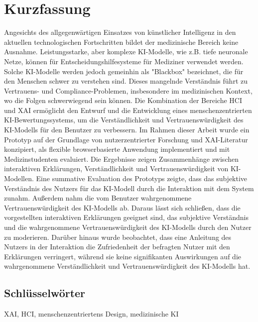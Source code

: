 \chapter*{Kurzfassung}
Angesichts des allgegenwärtigen Einsatzes von künstlicher Intelligenz in den aktuellen technologischen Fortschritten bildet der medizinische Bereich keine Ausnahme. Leistungsstarke, aber komplexe KI-Modelle, wie z.B. tiefe neuronale Netze, können für Entscheidungshilfesysteme für Mediziner verwendet werden. Solche KI-Modelle werden jedoch gemeinhin als "Blackbox" bezeichnet, die für den Menschen schwer zu verstehen sind. Dieses mangelnde Verständnis führt zu Vertrauens- und Compliance-Problemen, insbesondere im medizinischen Kontext, wo die Folgen schwerwiegend sein können. Die Kombination der Bereiche HCI und XAI ermöglicht den Entwurf und die Entwicklung eines menschenzentrierten KI-Bewertungssystems, um die Verständlichkeit und Vertrauenswürdigkeit des KI-Modells für den Benutzer zu verbessern. Im Rahmen dieser Arbeit wurde ein Prototyp auf der Grundlage von nutzerzentrierter Forschung und XAI-Literatur konzipiert, als flexible browserbasierte Anwendung implementiert und mit Medizinstudenten evaluiert. Die Ergebnisse zeigen Zusammenhänge zwischen interaktiven Erklärungen, Verständlichkeit und Vertrauens\-würdigkeit von KI-Modellen. Eine summative Evaluation des Prototyps zeigte, dass das subjektive Verständnis des Nutzers für das KI-Modell durch die Interaktion mit dem System zunahm. Außerdem nahm die vom Benutzer wahrgenommene Vertrauenswürdigkeit des KI-Modells ab. Daraus lässt sich schließen, dass die vorgestellten interaktiven Erklärungen geeignet sind, das subjektive Verständnis und die wahrgenommene Vertrauenswürdigkeit des KI-Modells durch den Nutzer zu moderieren. Darüber hinaus wurde beobachtet, dass eine Anleitung des Nutzers in der Interaktion die Zufriedenheit der befragten Nutzer mit den Erklärungen verringert, während sie keine signifikanten Auswirkungen auf die wahrgenommene Verständlichkeit und Vertrauenswürdigkeit des KI-Modells hat.

\section*{Schlüsselwörter}
XAI, HCI, menschenzentriertens Design, medizinische KI

\newpage